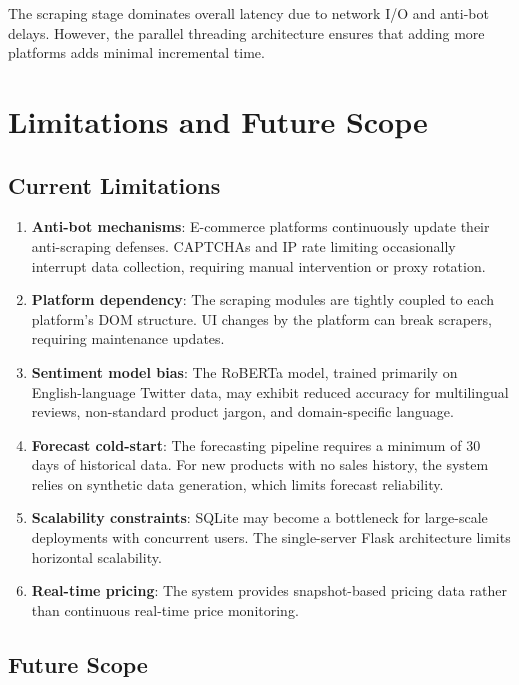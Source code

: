 \documentclass[conference]{IEEEtran}
\begin{document}
The scraping stage dominates overall latency due to network I/O and anti-bot delays. However, the parallel threading architecture ensures that adding more platforms adds minimal incremental time.

\section{Limitations and Future Scope}

\subsection{Current Limitations}

\begin{enumerate}
    \item \textbf{Anti-bot mechanisms}: E-commerce platforms continuously update their anti-scraping defenses. CAPTCHAs and IP rate limiting occasionally interrupt data collection, requiring manual intervention or proxy rotation.
    \item \textbf{Platform dependency}: The scraping modules are tightly coupled to each platform's DOM structure. UI changes by the platform can break scrapers, requiring maintenance updates.
    \item \textbf{Sentiment model bias}: The RoBERTa model, trained primarily on English-language Twitter data, may exhibit reduced accuracy for multilingual reviews, non-standard product jargon, and domain-specific language.
    \item \textbf{Forecast cold-start}: The forecasting pipeline requires a minimum of 30 days of historical data. For new products with no sales history, the system relies on synthetic data generation, which limits forecast reliability.
    \item \textbf{Scalability constraints}: SQLite may become a bottleneck for large-scale deployments with concurrent users. The single-server Flask architecture limits horizontal scalability.
    \item \textbf{Real-time pricing}: The system provides snapshot-based pricing data rather than continuous real-time price monitoring.
\end{enumerate}

\subsection{Future Scope}
\end{document}
